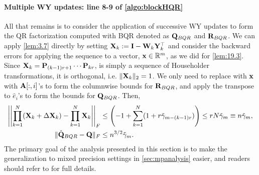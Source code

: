 \paragraph{Multiple WY updates: line 8-9 of \cref{algo:blockHQR}}
All that remains is to consider the application of successive WY updates to form the QR factorization computed with BQR denoted as $\mathbf{Q}_{BQR}$ and $\mathbf{R}_{BQR}$. 
We can apply \cref{lem:3.7} directly by setting $\mathbf{X}_{k}:= \mathbf{I}-\mathbf{W}_{k}\mathbf{Y}_{k}^{\top}$ and consider the backward errors for applying the sequence to a vector, $\mathbf{x}\in\mathbb{R}^{m}$, as we did for \cref{lem:19.3}. 
Since $\mathbf{X}_{k}=\mathbf{P}_{(k-1)r+1}\cdots\mathbf{P}_{kr}$, is simply a sequence of Householder transformations, it is orthogonal, i.e. $\|\mathbf{X}_{k}\|_2=1$.
We only need to replace with $\mathbf{x}$ with $\mathbf{A}[:,i]$'s to form the columnwise bounds for $\mathbf{R}_{BQR}$, and apply the transpose to $\hat{e}_i$'s to form the bounds for $\mathbf{Q}_{BQR}$. 
Then, 
\begin{align}
\left|\left|\prod_{k=1}^N (\bb{X}_{k} + \Delta \bb{X}_{k})- \prod_{k=1}^N\bb{X}_{k} \right|\right|_F &\leq\left(-1+\sum_{k=1}^N (1+r\tilde{\gamma}_{m-(k-1)r})\right) \leq rN\tilde{\gamma}_m \equiv n\tilde{\gamma}_m ,\label{eqn:BQR-mp}\\%
\|\hat{\bb{Q}}_{BQR}-\bb{Q}\|_F&\leq n^{3/2}\tilde{\gamma}_m. \label{eqn:BQR}
\end{align}
The primary goal of the analysis presented in this section is to make the generalization to mixed precision settings in \cref{sec:mpanalysis} easier, and readers should refer to \cite{golub2013matrix,Higham2002} for full details.